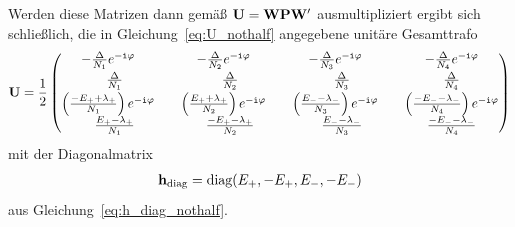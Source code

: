 Werden diese Matrizen dann gemäß $\mathbf{U} = \mathbf{W} \mathbf{P} \mathbf{W}'$ ausmultipliziert ergibt sich schließlich, die in Gleichung~\eqref{eq:U_nothalf} angegebene unitäre Gesamttrafo 
\begin{align}
    \mathbf{U} = \frac{1}{2} \begin{pmatrix}
        -\frac{\Delta}{N_1} e^{-\texttt{i} \varphi} \quad & -\frac{\Delta}{N_2} e^{-\texttt{i} \varphi} \quad & -\frac{\Delta}{N_3} e^{-\texttt{i} \varphi} \quad & -\frac{\Delta}{N_4} e^{-\texttt{i} \varphi} \\[0.3em]
        \frac{\Delta}{N_1} & \frac{\Delta}{N_2} & \frac{\Delta}{N_3} & \frac{\Delta}{N_4} \\[0.3em]
        \left(\frac{-E_+ + \lambda_+}{N_1}\right)e^{-\texttt{i} \varphi} \quad & \left(\frac{E_+ + \lambda_+}{N_2}\right)e^{-\texttt{i} \varphi} \quad & \left(\frac{E_- - \lambda_-}{N_3}\right)e^{-\texttt{i} \varphi} \quad & \left(\frac{-E_- - \lambda_-}{N_4}\right)e^{-\texttt{i} \varphi} \\[0.3em]
        \frac{E_+ - \lambda_+}{N_1} & \frac{-E_+ - \lambda_+}{N_2} & \frac{E_- - \lambda_-}{N_3} & \frac{-E_- - \lambda_-}{N_4}
    \end{pmatrix}
\end{align}
mit der Diagonalmatrix
\begin{align}
    \mathbf{h}_{\text{diag}} = \text{diag}(E_+, -E_+, E_-, -E_-)
\end{align}
aus Gleichung~\eqref{eq:h_diag_nothalf}.